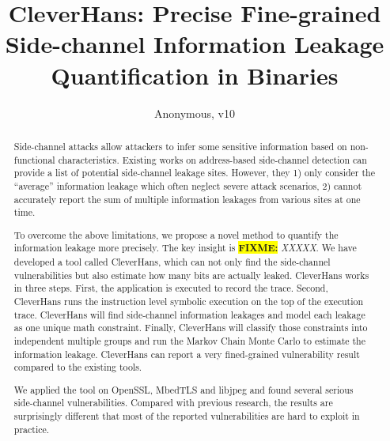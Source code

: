\documentclass[conference]{IEEEtran}
\newcommand{\highlight}[1]{\colorbox{yellow}{\textbf{#1}}}
\newcommand{\fixme}[1]{\highlight{FIXME:} \emph{#1}}
\newcommand{\tool}{TANA}
\renewcommand{\tool}{CleverHans}
\begin{document}
\title{\tool{}: Precise Fine-grained Side-channel Information Leakage Quantification in Binaries}
\author{Anonymous, v10}

\maketitle

\begin{abstract}
    Side-channel attacks allow attackers to infer some sensitive 
    information based on non-functional characteristics. 
    Existing works on address-based side-channel detection 
    can provide a list of potential side-channel leakage sites. However, they 
    1) only consider the ``average'' information leakage 
    which often neglect severe attack scenarios,
    2) cannot accurately report
    the sum of multiple information leakages from various sites at one time.
       
    To overcome the above limitations, we propose a novel method
    to quantify the information leakage more precisely.  
    The key insight is \fixme{XXXXX}.
    We have developed a tool called \tool{}, which can not only 
    find the side-channel vulnerabilities but also estimate how many bits are actually leaked. 
    \tool{} works in three steps. First, the application is executed to record the 
    trace. Second, \tool{} runs the instruction level symbolic execution on the top of the 
    execution trace. \tool{} will find side-channel information leakages and model each leakage 
    as one unique math constraint. Finally, \tool{} will classify those constraints into 
    independent multiple groups and run the Markov Chain Monte Carlo to estimate the 
    information leakage. \tool{} can report a very fined-grained vulnerability result 
    compared to the existing tools.
    
    We applied the tool on OpenSSL, MbedTLS and libjpeg and found several serious side-channel 
    vulnerabilities. Compared with previous research, the results are surprisingly different 
    that most of the reported vulnerabilities are hard to exploit in practice. 

\end{abstract}

\IEEEpeerreviewmaketitle
{}














\end{document}
